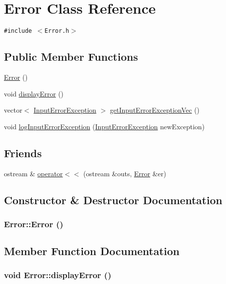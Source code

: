 \hypertarget{class_error}{
\section{Error Class Reference}
\label{class_error}
}
{\tt \#include $<$Error.h$>$}

\subsection*{Public Member Functions}
\begin{CompactItemize}
\item 
\hyperlink{class_error_cb42d6b0fbc526151de84e00e71bedac}{Error} ()
\item 
void \hyperlink{class_error_1e30c6faaa0ab367656f8133603c56e2}{display\-Error} ()
\item 
vector$<$ \hyperlink{class_input_error_exception}{Input\-Error\-Exception} $>$ \hyperlink{class_error_a46183aa0619a520653204dd10ba438e}{get\-Input\-Error\-Exception\-Vec} ()
\item 
void \hyperlink{class_error_97f2fe5a03ae8c36758744c05939bf02}{log\-Input\-Error\-Exception} (\hyperlink{class_input_error_exception}{Input\-Error\-Exception} new\-Exception)
\end{CompactItemize}
\subsection*{Friends}
\begin{CompactItemize}
\item 
ostream \& \hyperlink{class_error_79243d5219bfbe878ff20f74243b1c5a}{operator$<$$<$} (ostream \&outs, \hyperlink{class_error}{Error} \&er)
\end{CompactItemize}


\subsection{Constructor \& Destructor Documentation}
\hypertarget{class_error_cb42d6b0fbc526151de84e00e71bedac}{
\subsubsection[Error]{\setlength{\rightskip}{0pt plus 5cm}Error::Error ()}}
\label{class_error_cb42d6b0fbc526151de84e00e71bedac}




\subsection{Member Function Documentation}
\hypertarget{class_error_1e30c6faaa0ab367656f8133603c56e2}{
\subsubsection[displayError]{\setlength{\rightskip}{0pt plus 5cm}void Error::display\-Error ()}}
\label{class_error_1e30c6faaa0ab367656f8133603c56e2}



